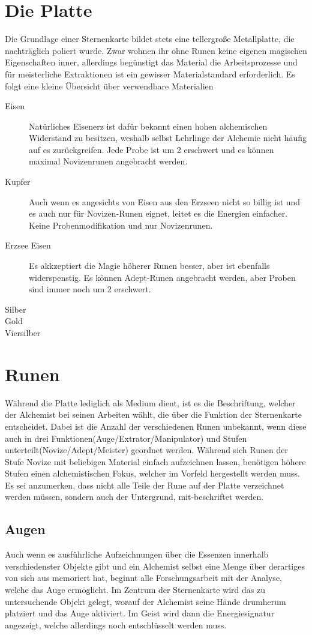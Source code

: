 \documentclass[a4paper,12pt,oneside]{book}
\begin{document}
\chapter{Die Platte}
Die Grundlage einer Sternenkarte bildet stets eine tellergroße Metallplatte, die nachträglich poliert wurde. Zwar wohnen ihr ohne Runen keine eigenen magischen Eigenschaften inner, allerdings begünstigt das Material die Arbeitsprozesse und für meisterliche Extraktionen ist ein gewisser Materialstandard erforderlich. Es folgt eine kleine Übersicht über verwendbare Materialien
\begin{description}
\item[Eisen]Natürliches Eisenerz ist dafür bekannt einen hohen alchemischen Widerstand zu besitzen, weshalb selbst Lehrlinge der Alchemie nicht häufig auf es zurückgreifen. Jede Probe ist um 2 erschwert und es können maximal Novizenrunen angebracht werden.
\item[Kupfer]Auch wenn es angesichts von Eisen aus den Erzseen nicht so billig ist und es auch nur für Novizen-Runen eignet, leitet es die Energien einfacher. Keine Probenmodifikation und nur Novizenrunen.
\item[Erzsee Eisen]Es akkzeptiert die Magie höherer Runen besser, aber ist ebenfalls widerspenstig. Es können Adept-Runen angebracht werden, aber Proben sind immer noch um 2 erschwert.
\item[Silber]
\item[Gold]
\item[Viersilber]
\end{description}


\chapter{Runen}
Während die Platte lediglich als Medium dient, ist es die Beschriftung, welcher der Alchemist bei seinen Arbeiten wählt, die über die Funktion der Sternenkarte entscheidet. Dabei ist die Anzahl der verschiedenen Runen unbekannt, wenn diese auch in drei Funktionen(Auge/Extrator/Manipulator) und Stufen unterteilt(Novize/Adept/Meister) geordnet werden. Während sich Runen der Stufe Novize mit beliebigen Material einfach aufzeichnen lassen, benötigen höhere Stufen einen alchemistischen Fokus, welcher im Vorfeld hergestellt werden muss. Es sei anzumerken, dass nicht alle Teile der Rune auf der Platte verzeichnet werden müssen, sondern auch der Untergrund, mit-beschriftet werden.

\section{Augen}
Auch wenn es ausführliche Aufzeichnungen über die Essenzen innerhalb verschiedenster Objekte gibt und ein Alchemist selbst eine Menge über derartiges von sich aus memoriert hat, beginnt alle Forschungsarbeit mit der Analyse, welche das Auge ermöglicht. Im Zentrum der Sternenkarte wird das zu untersuchende Objekt gelegt, worauf der Alchemist seine Hände drumherum platziert und das Auge aktiviert. Im Geist wird dann die Energiesignatur angezeigt, welche allerdings noch entschlüsselt werden muss. 
\end{document}
